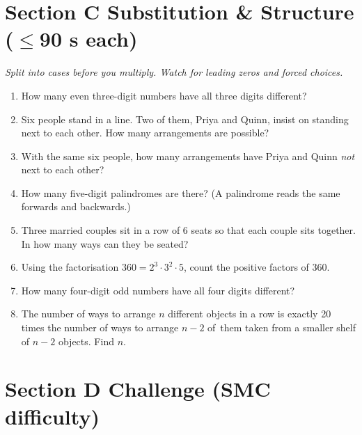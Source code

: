 \documentclass[11pt,a4paper]{article}
\begin{document}
\section*{Section C \quad Substitution \& Structure \hfill{\normalfont\small($\leq$90 s each)}}

\noindent\textit{Split into cases before you multiply. Watch for leading zeros and forced choices.}

\begin{enumerate}

\item How many even three-digit numbers have all three digits different?

\item Six people stand in a line. Two of them, Priya and Quinn, insist on standing next to each other. How many arrangements are possible?

\item With the same six people, how many arrangements have Priya and Quinn \emph{not} next to each other?

\item How many five-digit palindromes are there? (A palindrome reads the same forwards and backwards.)

\item Three married couples sit in a row of 6 seats so that each couple sits together. In how many ways can they be seated?

\item Using the factorisation $360 = 2^3 \cdot 3^2 \cdot 5$, count the positive factors of 360.

\item How many four-digit odd numbers have all four digits different?

\item The number of ways to arrange $n$ different objects in a row is exactly 20 times the number of ways to arrange $n-2$ of\, them taken from a smaller shelf of $n-2$ objects. Find $n$.

\end{enumerate}

\section*{Section D \quad Challenge \hfill{\normalfont\small(SMC difficulty)}}
\end{document}
